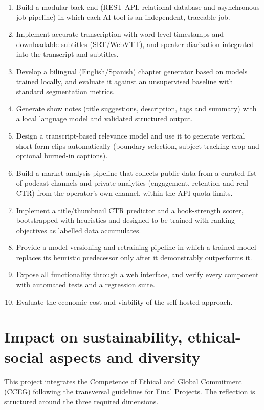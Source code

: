 \documentclass[ENG]{TFUOC}
\begin{document}
\begin{enumerate}
\item Build a modular back end (REST API, relational database and asynchronous job pipeline) in which each AI tool is an independent, traceable job.
\item Implement accurate transcription with word-level timestamps and downloadable subtitles (SRT/WebVTT), and speaker diarization integrated into the transcript and subtitles.
\item Develop a bilingual (English/Spanish) chapter generator based on models trained locally, and evaluate it against an unsupervised baseline with standard segmentation metrics.
\item Generate show notes (title suggestions, description, tags and summary) with a local language model and validated structured output.
\item Design a transcript-based relevance model and use it to generate vertical short-form clips automatically (boundary selection, subject-tracking crop and optional burned-in captions).
\item Build a market-analysis pipeline that collects public data from a curated list of podcast channels and private analytics (engagement, retention and real CTR) from the operator's own channel, within the API quota limits.
\item Implement a title/thumbnail CTR predictor and a hook-strength scorer, bootstrapped with heuristics and designed to be trained with ranking objectives as labelled data accumulates.
\item Provide a model versioning and retraining pipeline in which a trained model replaces its heuristic predecessor only after it demonstrably outperforms it.
\item Expose all functionality through a web interface, and verify every component with automated tests and a regression suite.
\item Evaluate the economic cost and viability of the self-hosted approach.
\end{enumerate}

\section{Impact on sustainability, ethical-social aspects and diversity}
\label{s:etic}

This project integrates the Competence of Ethical and Global Commitment (CCEG) following the transversal guidelines for Final Projects. The reflection is structured around the three required dimensions.
\end{document}
